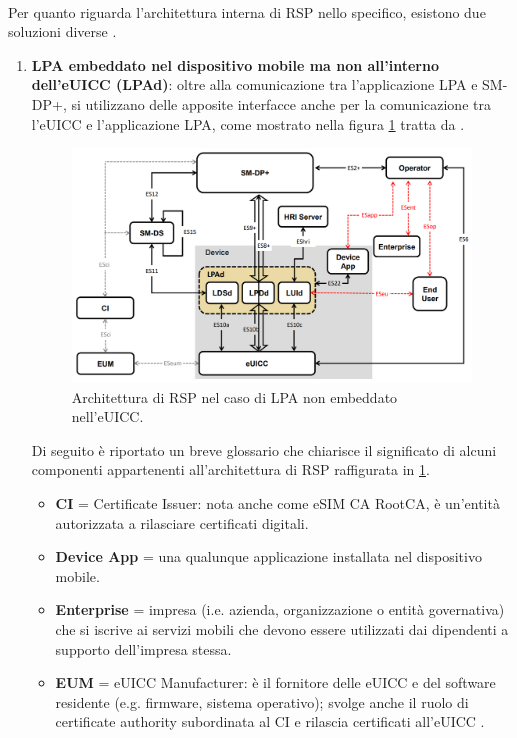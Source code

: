 \documentclass[10pt, twoside, openany]{book}
\begin{document}
\\Per quanto riguarda l'architettura interna di RSP nello specifico, esistono due soluzioni diverse \cite{GSMA-docs-new}.
\begin{enumerate}
\item \textbf{LPA embeddato nel dispositivo mobile ma non all'interno dell'eUICC (LPAd)}: oltre alla comunicazione tra l'applicazione LPA e SM-DP+, si utilizzano delle apposite interfacce anche per la comunicazione tra l'eUICC e l'applicazione LPA, come mostrato nella figura \ref{fig:RSP-LPAd} tratta da \cite{GSMA-docs-new}.
\begin{figure}
\includegraphics[width=\linewidth]{RSP-LPAd.png}
\caption{Architettura di RSP nel caso di LPA non embeddato nell'eUICC.}
\label{fig:RSP-LPAd}
\end{figure}
Di seguito è riportato un breve glossario che chiarisce il significato di alcuni componenti appartenenti all'architettura di RSP raffigurata in \ref{fig:RSP-LPAd}.
\begin{itemize}
\item \textbf{CI} = Certificate Issuer: nota anche come eSIM CA RootCA, è un'entità autorizzata a rilasciare certificati digitali.
\item \textbf{Device App} = una qualunque applicazione installata nel dispositivo mobile.
\item \textbf{Enterprise} = impresa (i.e. azienda, organizzazione o entità governativa) che si iscrive ai servizi mobili che devono essere utilizzati dai dipendenti a supporto dell'impresa stessa.
\item \textbf{EUM} = eUICC Manufacturer: è il fornitore delle eUICC e del software residente (e.g. firmware, sistema operativo); svolge anche il ruolo di certificate authority subordinata al CI e rilascia certificati all'eUICC \cite{GSMA-docs-new}\cite{Sec-analysis}.

\end{itemize}
\end{enumerate}
\end{document}
